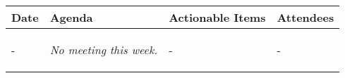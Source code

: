\begin{table}[!h]
    \centering
    \begin{tabularx}{\textwidth}{|l|X|X|X|}
        \hline
        Date & Agenda & Actionable Items & Attendees \\
        \hline
        \hline
        - & 
        \begin{myitemize}
            \textit{No meeting this week.}
        \end{myitemize} & 
        \begin{myitemize}
            -
        \end{myitemize} & 
        \begin{myitemize}
            -
        \end{myitemize} \\
        \hline
    \end{tabularx}
\end{table}

